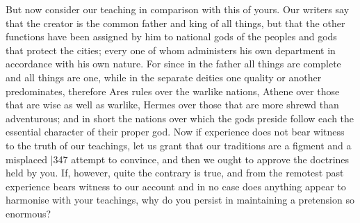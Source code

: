 But now consider our teaching in comparison with this of yours. Our writers say that the creator is the common father and king of all things, but that the other functions have been assigned by him to national gods of the peoples and gods that protect the cities; every one of whom administers his own department in accordance with his own nature. For since in the father all things are complete and all things are one, while in the separate deities one quality or another predominates, therefore Ares rules over the warlike nations, Athene over those that are wise as well as warlike, Hermes over those that are more shrewd than adventurous; and in short the nations over which the gods preside follow each the essential character of their proper god. Now if experience does not bear witness to the truth of our teachings, let us grant that our traditions are a figment and a misplaced
|347 attempt to convince, and then we ought to approve the doctrines held by you. If, however, quite the contrary is true, and from the remotest past experience bears witness to our account and in no case does anything appear to harmonise with your teachings, why do you persist in maintaining a pretension so enormous?

